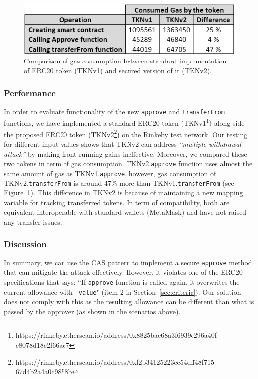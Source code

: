 
\begin{figure}[t]
	\centering
	\includegraphics[width=1.0\linewidth]{figures/multiple_withdrawal_22.png}
	\caption{Comparison of gas consumption between standard implementation of ERC20 token (TKNv1) and secured version of it (TKNv2).\label{fig:gas}}
\end{figure}

\subsubsection*{Performance} In order to evaluate functionality of the new \texttt{approve} and \texttt{transferFrom} functions, we have implemented a standard ERC20 token (TKNv1\footnote{https://rinkeby.etherscan.io/address/0x8825bac68a3f6939c296a40f c8078d18c2f66ac7}) along side the proposed ERC20 token (TKNv2\footnote{https://rinkeby.etherscan.io/address/0xf2b34125223ee54dff48f715 67d4b2a4a0c9858b}) on the Rinkeby test network. Our testing for different input values shows that TKNv2 can address \textit{``multiple withdrawal attack''} by making front-running gains ineffective. Moreover, we compared these two tokens in term of gas consumption. TKNv2.\texttt{approve} function uses almost the same amount of gas as TKNv1.\texttt{approve}, however, gas consumption of TKNv2.\texttt{transferFrom} is around 47\% more than TKNv1.\texttt{transferFrom} (see Figure~\ref{fig:gas}). This difference in TKNv2 is because of maintaining a new mapping variable for tracking transferred tokens. In term of compatibility, both are equivalent interoperable with standard wallets (\eg MetaMask) and have not raised any transfer issues.

\subsubsection*{Discussion} In summary, we can use the CAS pattern to implement a secure \texttt{approve} method that can mitigate the attack effectively. However, it violates one of the ERC20 specifications that says: ``If \texttt{approve} function is called again, it overwrites the current allowance with \texttt{\_value}" (item 2 in Section~\ref{sec:criteria}). Our solution does not comply with this as the resulting allowance can be different than what is passed by the approver (as shown in the scenarios above).

